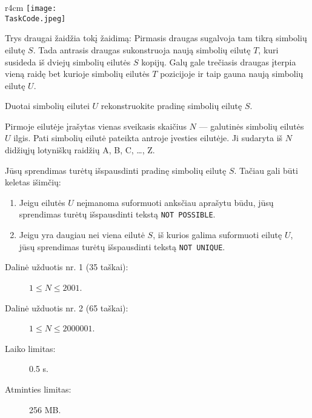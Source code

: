 \documentclass{boi2014-lt}
\renewcommand{\TaskCode}{friends}
\begin{document}
    \begin{wrapfigure}{r}{4cm}
        \vspace{-24pt}
		\texttt{[image: \\TaskCode.jpeg]}
	\end{wrapfigure}
	Trys draugai žaidžia tokį žaidimą:
	Pirmasis draugas sugalvoja tam tikrą simbolių eilutę $S$.
	Tada antrasis draugas sukonstruoja naują simbolių eilutę $T$, kuri susideda
	iš dviejų simbolių eilutės $S$ kopijų.
	Galų gale trečiasis draugas įterpia vieną raidę bet kurioje simbolių eilutės
	$T$ pozicijoje ir taip gauna naują simbolių eilutę $U$.

    \Task
    Duotai simbolių eilutei $U$ rekonstruokite pradinę simbolių eilutę $S$.

    \Input
    Pirmoje eilutėje įrašytas vienas sveikasis skaičius $N$ --- galutinės simbolių
    eilutės $U$ ilgis. Pati simbolių eilutė pateikta antroje įvesties eilutėje.
    Ji sudaryta iš $N$ didžiųjų lotyniškų raidžių A, B, C, \ldots{}, Z.

    \Output
    Jūsų sprendimas turėtų išspausdinti pradinę simbolių eilutę $S$.
    Tačiau gali būti keletas išimčių:
    \begin{enumerate}
        \item Jeigu eilutės $U$ neįmanoma suformuoti anksčiau aprašytu būdu,
        jūsų sprendimas turėtų išspausdinti tekstą {\tt NOT POSSIBLE}.
        \item Jeigu yra daugiau nei viena eilutė $S$, iš kurios galima
        suformuoti eilutę $U$, jūsų sprendimas turėtų išspausdinti tekstą
        {\tt NOT UNIQUE}.
    \end{enumerate}
    

    \Examples


    \Scoring

    \begin{description}
        \item[Dalinė užduotis nr. 1 (35 taškai):] $1 \le N \le 2001$.
        \item[Dalinė užduotis nr. 2 (65 taškai):] $1 \le N \le 2000001$.
    \end{description}

    \Constraints

    \begin{description}
        \item[Laiko limitas:] 0.5 s.
        \item[Atminties limitas:] 256 MB.
    \end{description}
\end{document}
